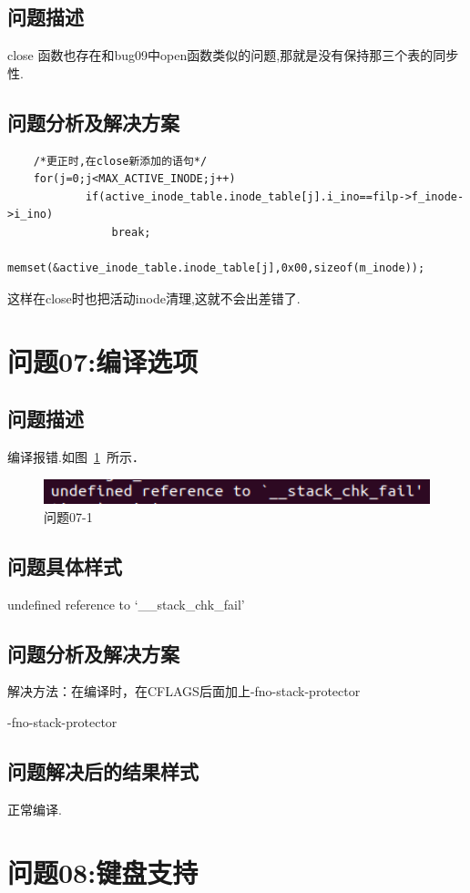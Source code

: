 \subsection{问题描述}
close 函数也存在和bug09中open函数类似的问题,那就是没有保持那三个表的同步性.
\subsection{问题分析及解决方案}
\begin{verbatim}
    /*更正时,在close新添加的语句*/
    for(j=0;j<MAX_ACTIVE_INODE;j++)
    		if(active_inode_table.inode_table[j].i_ino==filp->f_inode->i_ino)
    			break;
    	memset(&active_inode_table.inode_table[j],0x00,sizeof(m_inode));
\end{verbatim}
这样在close时也把活动inode清理,这就不会出差错了.

\section{问题07:编译选项}
\subsection{问题描述}
编译报错.如图~\ref{problem07_1}~所示．	

\begin{figure}[!htbp]
		\centering	\includegraphics[width=14cm]{pic/assets/problems/problem07_1}
        \caption{问题07-1}	\label{problem07_1}	\end{figure}

\subsection{问题具体样式}
undefined reference to `\_\_stack\_chk\_fail'
\subsection{问题分析及解决方案}
解决方法：在编译时，在CFLAGS后面加上-fno-stack-protector

-fno-stack-protector 

\subsection{问题解决后的结果样式}
正常编译.

\section{问题08:键盘支持}
